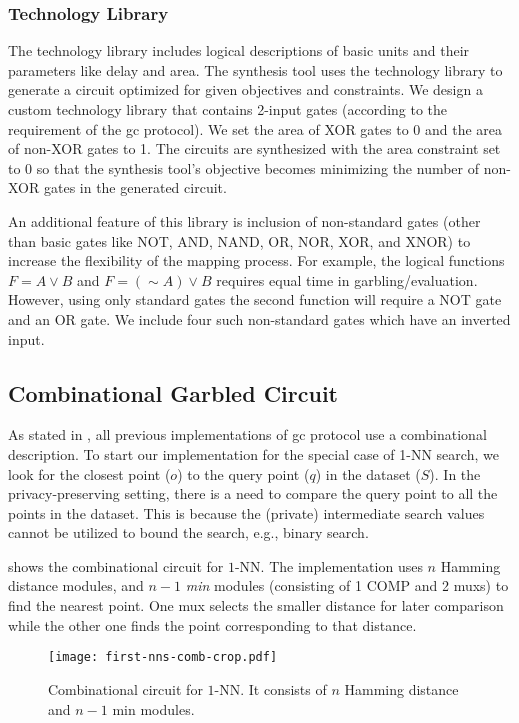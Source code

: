 \subsubsection{Technology Library}
The technology library includes logical descriptions of basic units and their parameters like delay and area.
The synthesis tool uses the technology library to generate a circuit optimized for given objectives and constraints.
We design a custom technology library that contains 2-input gates (according to the requirement of the \acrshort{gc} protocol).
We set the area of XOR gates to 0 and the area of non-XOR gates to 1.
The circuits are synthesized with the area constraint set to 0 so that the synthesis tool's objective becomes minimizing the number of non-XOR gates in the generated circuit.

An additional feature of this library is inclusion of non-standard gates (other than basic gates like NOT, AND, NAND, OR, NOR, XOR, and XNOR) to increase the flexibility of the mapping process.
For example, the logical functions $F = A\vee B$ and $F = (\sim A)\vee B$ requires equal time in garbling/evaluation.
However, using only standard gates the second function will require a NOT gate and an OR gate.
We include four such non-standard gates which have an inverted input.

\subsection{Combinational Garbled Circuit}\label{ssec:knn-combgc}
As stated in , all previous implementations of \acrshort{gc} protocol use a combinational description.
To start our implementation for the special case of 1-NN search, we look for the closest point ($o$) to the query point ($q$) in the dataset ($S$).
In the privacy-preserving setting, there is a need to compare the query point to all the points in the dataset.
This is because the (private) intermediate search values cannot be utilized to bound the search, e.g., binary search.

 shows the combinational circuit for $1$-NN.
The implementation uses $n$ Hamming distance modules, and $n-1$ \emph{min} modules (consisting of 1 COMP and 2 \acrshort{mux}s) to find the nearest point.
One \acrshort{mux} selects the smaller distance for later comparison while the other one finds the point corresponding to that distance.

\begin{figure}
\centering
\texttt{[image: first-nns-comb-crop.pdf]}
\caption{Combinational circuit for $1$-NN.
It consists of $n$ Hamming distance and $n-1$ min modules.}
\label{fig:fist-nns-comb}
\end{figure}

